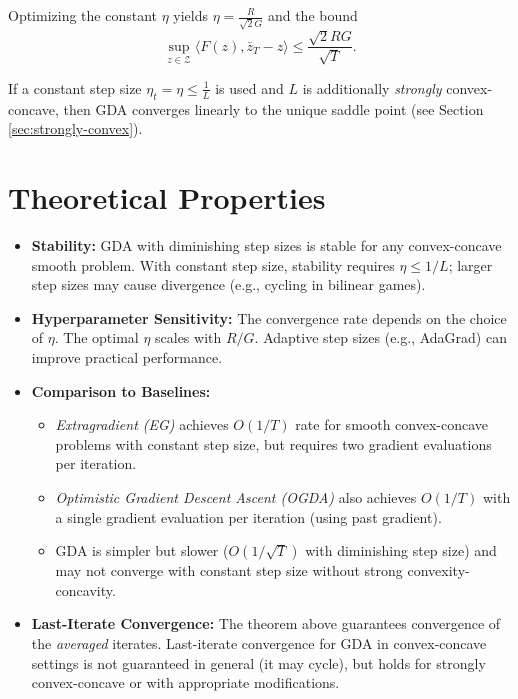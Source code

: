 \documentclass{article}
\begin{document}
Optimizing the constant $\eta$ yields $\eta = \frac{R}{\sqrt{2}G}$ and the bound
\[
\sup_{z \in \mathcal{Z}} \langle F(z), \bar{z}_T - z \rangle \le \frac{\sqrt{2} R G}{\sqrt{T}}.
\]

If a constant step size $\eta_t = \eta \le \frac{1}{L}$ is used and $L$ is additionally \textit{strongly} convex-concave, then GDA converges linearly to the unique saddle point (see Section \ref{sec:strongly-convex}).

\section*{Theoretical Properties}
\begin{itemize}
    \item \textbf{Stability:} GDA with diminishing step sizes is stable for any convex-concave smooth problem. With constant step size, stability requires $\eta \le 1/L$; larger step sizes may cause divergence (e.g., cycling in bilinear games).
    \item \textbf{Hyperparameter Sensitivity:} The convergence rate depends on the choice of $\eta$. The optimal $\eta$ scales with $R/G$. Adaptive step sizes (e.g., AdaGrad) can improve practical performance.
    \item \textbf{Comparison to Baselines:}
    \begin{itemize}
        \item \textit{Extragradient (EG)} achieves $O(1/T)$ rate for smooth convex-concave problems with constant step size, but requires two gradient evaluations per iteration.
        \item \textit{Optimistic Gradient Descent Ascent (OGDA)} also achieves $O(1/T)$ with a single gradient evaluation per iteration (using past gradient).
        \item GDA is simpler but slower ($O(1/\sqrt{T})$ with diminishing step size) and may not converge with constant step size without strong convexity-concavity.
    \end{itemize}
    \item \textbf{Last-Iterate Convergence:} The theorem above guarantees convergence of the \textit{averaged} iterates. Last-iterate convergence for GDA in convex-concave settings is not guaranteed in general (it may cycle), but holds for strongly convex-concave or with appropriate modifications.
\end{itemize}
\end{document}
